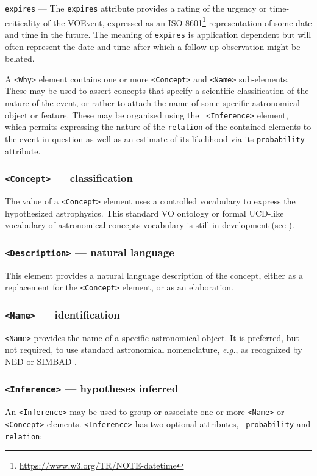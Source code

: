 \documentclass[11pt,a4paper]{ivoa}
\begin{document}
 {\tt expires}\label{sec:3.6.2} --- 
The {\tt expires} attribute provides a rating of the urgency or time-criticality
of the VOEvent, expressed as an ISO-8601\footnote{\url{
https://www.w3.org/TR/NOTE-datetime}} representation of some date and time in 
the future. The meaning of {\tt expires} is application dependent but will often
represent the date and time after which a follow-up observation might be 
belated. 

A {\tt <Why>} element contains one or more {\tt <Concept>} and {\tt <Name>} 
sub-elements. These may be used to assert concepts that specify a scientific 
classification of the nature of the event, or rather to attach the name of some 
specific astronomical object or feature. These may be organised using the {\tt 
<Inference>} element, which permits expressing the nature of the {\tt relation} 
of the contained elements to the event in question as well as an estimate of its 
likelihood via its {\tt probability} attribute. 

\setcounter{subsubsection}{2} 
\subsubsection{{\tt <Concept>} --- classification}\label{sec:3.6.3}
The value of a {\tt <Concept>} element uses a controlled vocabulary to express 
the hypothesized astrophysics. This standard VO ontology or formal UCD-like 
vocabulary of astronomical concepts vocabulary is still in development (see 
\citep{2018ivoa.spec.0527M}).

\subsubsection{{\tt <Description>} --- natural language}\label{sec:3.6.4}
This element provides a natural language description of the concept, either as 
a replacement for the {\tt <Concept>} element, or as an elaboration. 

\subsubsection{{\tt <Name>} --- identification}\label{sec:3.6.5}
{\tt <Name>} provides the name of a specific astronomical object. It is 
preferred, but not required, to use standard astronomical nomenclature, 
\emph{e.g.}, as recognized by NED \citep{bib22} or SIMBAD \citep{bib23}. 

\subsubsection{{\tt <Inference>} --- hypotheses inferred}\label{sec:3.6.6}
An {\tt <Inference>} may be used to group or associate one or more {\tt <Name>} 
or {\tt <Concept>} elements. {\tt <Inference>} has two optional attributes, {\tt
probability} and {\tt relation}: 
\end{document}
